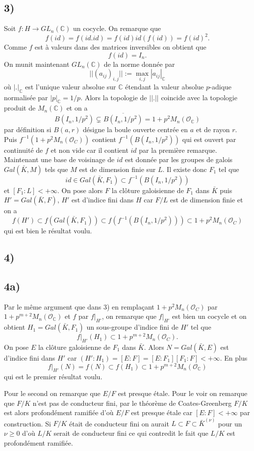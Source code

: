 \documentclass[a4paper,12pt]{article}
\newcommand{\C}{\mathbb{C}}
\newcommand{\Or}{\mathcal{O}}
\theoremstyle{plain}
\theoremstyle{definition}
\theoremstyle{remark}
\begin{document}
\subsection*{3)}
Soit $f\colon H\to GL_n(\C)$ un cocycle. On remarque que 
\[f(id)=f(id.id)=f(id)id(f(id))=f(id)^2.\] Comme $f$ est à valeurs
dans des matrices inversibles on obtient que \[f(id)=I_n.\] 
On munit maintenant $GL_n(\C)$ de la norme donnée par 
\[||(a_{ij})_{i,j}||:=\max_{i,j}|a_{ij}|_\C\] où $|.|_\C$ est
l'unique valeur absolue sur $\C$ étendant la valeur
absolue $p$-adique normalisée par $|p|_\C=1/p$. Alors la topologie
de $||.||$ coincide avec la topologie produit de $M_n(\C)$ et on
a 
\[B(I_n,1/p^2)\subsetneq\overline{B(I_n,1/p^2)}=1+p^2M_n(\Or_\C)\]
par définition si $B(a,r)$ désigne la boule ouverte centrée en
$a$ et de rayon $r$. Puis $f^{-1}(1+p^2M_n(\Or_C))$ contient 
$f^{-1}(B(I_n,1/p^2))$ qui est ouvert par continuité de $f$ et
non vide car il contient $id$ par la première remarque. Maintenant
une base de voisinage de $id$ est donnée par les groupes de galois 
$Gal(\bar K, M)$ tels que $M$ est de dimension finie sur $L$. Il
existe donc $F_1$ tel que 
\[id\in Gal(\bar K,F_1)\subset f^{-1}(B(I_n,1/p^2))\]
et $[F_1:L]<+\infty$. On pose alors $F$ la clôture galoisienne de
$F_1$ dans $\bar K$ puis $H'=Gal(\bar K, F)$, $H'$ est 
d'indice fini dans $H$ car $F/L$ est de dimension finie et on a
\[f(H')\subset f(Gal(\bar K,F_1))\subset f(f^{-1}(B(I_n,1/p^2)))\subset 1+p^2M_n(\Or_C)\]
qui est bien le résultat voulu.

\subsection*{4)}
\subsection*{4a)}
Par le même argument que dans 3) en remplaçant $1+p^2M_n(\Or_C)$
par $1+p^{m+2}M_n(\Or_\C)$ et $f$ par $f|_{H'}$, on remarque que 
$f|_{H'}$ est bien un cocycle et on obtient $H_1=Gal(\bar K,F_1)$
un sous-groupe d'indice fini de $H'$ tel que \[f|_{H'}(H_1)\subset
1+p^{m+2}M_n(\Or_C).\]
On pose $E$ la clôture galoisienne
de $F_1$ dans $\bar K$. Alors $N=Gal(\bar K,E)$ est d'indice fini
dans $H'$ car $(H':H_1)=[E:F]=[E:F_1][F_1:F]<+\infty$. En
plus \[f|_{H'}(N)=f(N)\subset f(H_1)\subset 1+p^{m+2}M_n(\Or_\C)\]
qui est le premier résultat voulu.

Pour le second on remarque que $E/F$ est presque étale. Pour le
voir on remarque que $F/K$ n'est pas de conducteur fini, par le
théorème de Coates-Greenberg $F/K$ est alors profondément ramifiée
d'où $E/F$ est presque étale car $[E:F]<+\infty$ par construction.
Si $F/K$ était de conducteur fini
on aurait $L\subset F\subset \bar K^{(\nu)}$ pour un $\nu\geq 0$
d'où $L/K$ serait de conducteur fini ce qui contredit le fait
que $L/K$ est profondément ramifiée.
\end{document}
